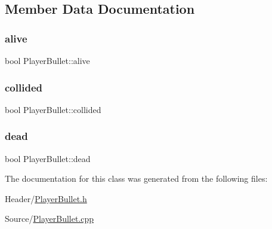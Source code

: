 \subsection{Member Data Documentation}
\mbox{\label{class_player_bullet_a8fd39df74f1886467118c6b7b5caed39}} 
\subsubsection{\texorpdfstring{alive}{alive}}
{\footnotesize\ttfamily bool Player\+Bullet\+::alive}

\mbox{\label{class_player_bullet_a3b1de396870aea406eeb3302b7d57463}} 
\subsubsection{\texorpdfstring{collided}{collided}}
{\footnotesize\ttfamily bool Player\+Bullet\+::collided}

\mbox{\label{class_player_bullet_a831e4e774e0f022e7149de9d62a58e5a}} 
\subsubsection{\texorpdfstring{dead}{dead}}
{\footnotesize\ttfamily bool Player\+Bullet\+::dead}



The documentation for this class was generated from the following files\+:\begin{DoxyCompactItemize}
\item 
Header/\mbox{\hyperlink{_player_bullet_8h}{Player\+Bullet.\+h}}\item 
Source/\mbox{\hyperlink{_player_bullet_8cpp}{Player\+Bullet.\+cpp}}\end{DoxyCompactItemize}
